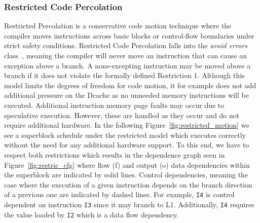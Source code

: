 \subsubsection{Restricted Code Percolation}
\label{rest_code_per}
Restricted Percolation is a conservative code motion technique where the compiler moves instructions across basic blocks or control-flow boundaries under strict safety conditions. Restricted Code Percolation falls into the \textit{avoid errors} class~\cite{bringmannMH95}, meaning the compiler will never move an instruction that can cause an exception above a branch. A none-excepting instruction may be moved above a branch if it does not violate the formally defined Restriction 1. Although this model limits the degrees of freedom for code motion, it for example does not add additional pressure on the Dcache as no unneeded memory instructions will be executed. Additional instruction memory page faults may occur due to speculative execution. However, these are handled as they occur and do not require additional hardware.  In the following Figure~\ref{fig:restricted_motion} we see a superblock schedule under the restricted model which executes correctly without the need for any additional hardware support. To this end, we have to respect both restrictions which results in the dependence graph seen in Figure~\ref{fig:restric_cfg} where flow (f) and output (o) data dependencies within the superblock are indicated by solid lines. Control dependencies, meaning the case where the execution of a given instruction depends on the branch direction of a previous one are indicated by dashed lines. For example, \texttt{I4} is control dependent on instruction \texttt{I3} since it may branch to L1. Additionally, \texttt{I4} requires the value loaded by \texttt{I2} which is a data flow dependency.

